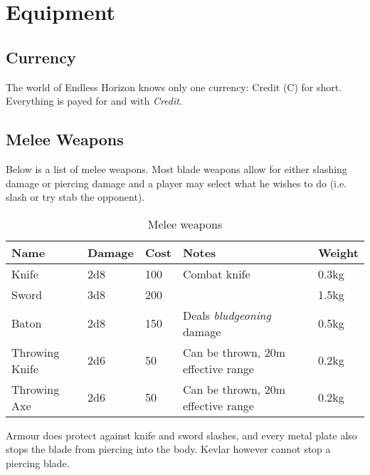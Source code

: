 \chapter{Equipment}
\label{chap:Equipment}

\section{Currency}
\label{sec:10-Currency}

The world of Endless Horizon knows only one currency: Credit (C) for short.
Everything is payed for and with \emph{Credit}.

\section{Melee Weapons}
\label{sec:10-Melee Weapons}

Below is a list of melee weapons. Most blade weapons allow for either slashing
damage or piercing damage and a player may select what he wishes to do (i.e.
slash or try stab the opponent).

\begin{table}
  \label{tab:Melee}
  \caption{Melee weapons}
  \begin{center}
    \begin{tabular}{| l | l | l | l | l |}
      \hline
      \textbf{Name} & \textbf{Damage} & \textbf{Cost} &
      \textbf{Notes} & \textbf{Weight} \\ \hline

      Knife & 2d8 & 100 & Combat knife & 0.3kg \\ \hline
      Sword & 3d8 & 200 & & 1.5kg \\ \hline
      Baton & 2d8 & 150 & Deals \emph{bludgeoning} damage & 0.5kg \\ \hline

      Throwing Knife & 2d6 & 50 & Can be thrown, 20m effective range & 0.2kg \\ \hline
      Throwing Axe   & 2d6 & 50 & Can be thrown, 20m effective range & 0.2kg \\ \hline

    \end{tabular}
  \end{center}
\end{table}

Armour does protect against knife and sword slashes, and every metal plate
also stops the blade from piercing into the body. Kevlar however cannot stop
a piercing blade.

